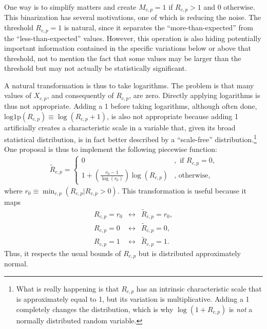 \documentclass[12pt]{article}
\begin{document}
One way is to simplify matters and create $M_{c,p} = 1$ if $R_{c,p}>1$ and 0 otherwise. This binarization has several motivations, one of which is reducing the noise. The threshold $R_{c,p}=1$ is natural, since it separates the ``more-than-expected'' from the ``less-than-expected'' values. However, this operation is also hiding potentially important information contained in the specific variations below or above that threshold, not to mention the fact that some values may be larger than the threshold but may not actually be statistically significant.

A natural transformation is thus to take logarithms. The problem is that many values of $X_{c,p}$, and consequently of $R_{c,p}$, are zero. Directly applying logarithms is thus not appropriate. Adding a 1 before taking logarithms, although often done, $\mathrm{log1p}(R_{c,p})\equiv \log(R_{c,p}+1)$, is also not appropriate because adding 1 artificially creates a characteristic scale in a variable that, given its broad statistical distribution, is in fact better described by a ``scale-free'' distribution.\footnote{What is really happening is that $R_{c,p}$ has an intrinsic characteristic scale that is approximately equal to 1, but its variation is multiplicative. Adding a 1 completely changes the distribution, which is why $\log(1+R_{c,p})$ is \emph{not} a normally distributed random variable.} One proposal is thus to implement the following piecewise function:
\begin{align}
	\widetilde{R}_{c,p}=
	\begin{cases}
		0&,\text{ if $R_{c,p}=0$,} \\
		1+\left(\frac{r_0-1}{\log(r_0)}\right)\log(R_{c,p})&,\text{ otherwise,}
	\end{cases}
\end{align}
where $r_0\equiv \min_{c,p}\left(R_{c,p}|R_{c,p}>0\right)$. This transformation is useful because it maps 
\begin{eqnarray*}
	R_{c,p}=r_0&\longleftrightarrow&\widetilde{R}_{c,p}=r_0, \\
	R_{c,p}=0&\longleftrightarrow&\widetilde{R}_{c,p}=0, \\
	R_{c,p}=1&\longleftrightarrow&\widetilde{R}_{c,p}=1. 
\end{eqnarray*}
Thus, it respects the usual bounds of $R_{c,p}$ but is distributed approximately normal.
\end{document}
